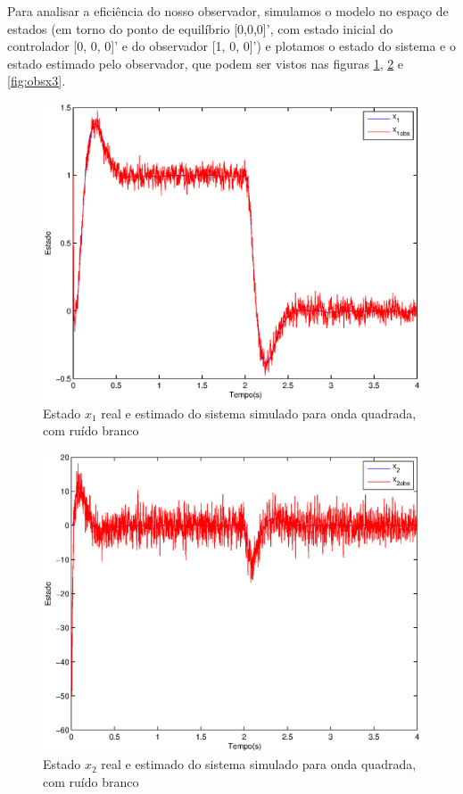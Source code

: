 \documentclass{article}
\begin{document}
Para analisar a eficiência do nosso observador, simulamos o modelo no espaço de estados (em torno do ponto de equilíbrio [0,0,0]', com estado inicial do controlador [0, 0, 0]' e do observador [1, 0, 0]') e plotamos o estado do sistema e o estado estimado pelo observador, que podem ser vistos nas figuras \ref{fig:obsx1}, \ref{fig:obsx2} e \ref{fig:obsx3}.
\begin{figure}[H]
	\centering
	\includegraphics[width=0.8\linewidth]{../obsx1}
	\caption{Estado $x_1$ real e estimado do sistema simulado para onda quadrada, com ruído branco}
	\label{fig:obsx1}
\end{figure}
\begin{figure}[H]
	\centering
	\includegraphics[width=0.8\linewidth]{../obsx2}
	\caption{Estado $x_2$ real e estimado do sistema simulado para onda quadrada, com ruído branco}
	\label{fig:obsx2}
\end{figure}
\end{document}
